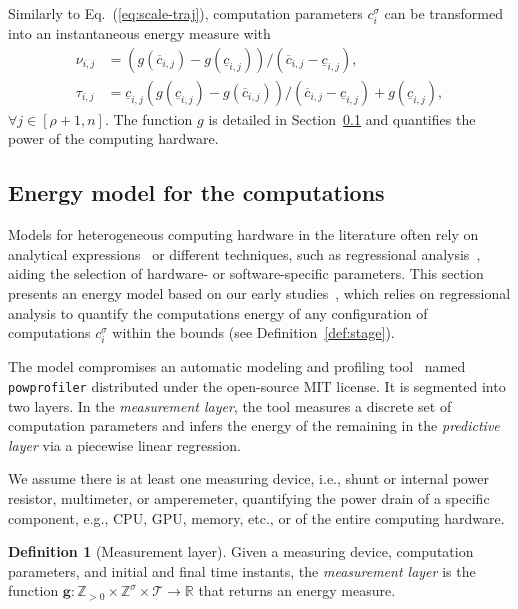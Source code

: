 \documentclass[letterpaper,10pt,journal,twoside]{IEEEtran}
\newcommand{\stt}[1]{{\small\tt #1}} %
\newcommand{\powprof}{\stt{powprofiler}}
\theoremstyle{definition}
\newtheorem{defn}{Definition}[section]
\begin{document}
Similarly to Eq.~(\ref{eq:scale-traj}), computation parameters $c_i^\sigma$ can be transformed into an instantaneous energy measure with %
\begin{subequations}\label{eq:scale-comp}\begin{align}
  \nu_{i,j}&=(g(\overline{c}_{i,j})-g(\underline{c}_{i,j}))/(\overline{c}_{i,j}-\underline{c}_{i,j}),\\
  \tau_{i,j}&=\underline{c}_{i,j}(g(\underline{c}_{i,j})-g(\overline{c}_{i,j}))/(\overline{c}_{i,j}-\underline{c}_{i,j})+g(\underline{c}_{i,j}),
\end{align}\end{subequations}
$\forall j\in[\rho+1,n]$. The function $g$ is detailed in Section~\ref{sec:mod-com} and quantifies the power of the computing hardware.

\subsection{Energy model for the computations}
\label{sec:mod-com}

Models for heterogeneous computing hardware in the literature often rely on analytical expressions~\cite{marowka2017energy,%
yang2017designing} or different techniques, such as regressional analysis~\cite{bailey2014adaptive,ma2012holistic,seewald2019coarse}, aiding the selection of hardware- or software-specific parameters. This section presents an energy model based on our early studies~\cite{seewald2019component,seewald2019coarse}, which relies on regressional analysis to quantify the computations energy of any configuration of computations $c_i^\sigma$ within the bounds (see Definition~\ref{def:stage}).

The model compromises an automatic modeling and profiling tool~\cite{seewald2019coarse} named \powprof{} distributed %
under the open-source MIT license. It is segmented into two layers. In the \emph{measurement layer}, the tool measures a discrete set of computation parameters and infers the energy of the remaining in the \emph{predictive layer} via a piecewise linear regression.

We assume there is at least one measuring device, i.e., shunt or internal power resistor, multimeter, or amperemeter, quantifying the power drain of a specific component, e.g., CPU, GPU, memory, etc., or of the entire computing hardware.

\begin{defn}[Measurement layer]\label{def:meas}
  Given a measuring device, computation parameters, and initial and final time instants, the \emph{measurement layer} is the function $\mathbf{g}:\mathbb{Z}_{>0}\times\mathbb{Z}^\sigma\times\mathcal{T}\rightarrow\mathbb{R}$ that returns an energy measure.
\end{defn}
\end{document}
